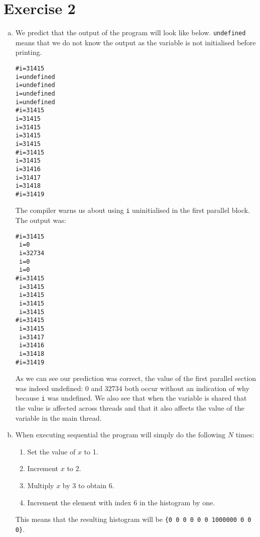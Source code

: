 \documentclass[a4paper]{article}
\begin{document}
\section{Exercise 2}
\begin{enumerate}[(a)]
	\item We predict that the output of the program will look like below. \texttt{undefined} means that we do not know the output as the variable is not initialised before printing.
		\begin{lstlisting}
#i=31415
i=undefined
i=undefined
i=undefined
i=undefined
#i=31415
i=31415
i=31415
i=31415
i=31415
#i=31415
i=31415
i=31416
i=31417
i=31418
#i=31419
		\end{lstlisting}
		The compiler warns us about using \texttt{i} uninitialised in the first parallel block. The output was:
		\begin{lstlisting}
#i=31415
 i=0
 i=32734
 i=0
 i=0
#i=31415
 i=31415
 i=31415
 i=31415
 i=31415
#i=31415
 i=31415
 i=31417
 i=31416
 i=31418
#i=31419
		\end{lstlisting}
		As we can see our prediction was correct, the value of the first parallel section was indeed undefined: 0 and 32734 both occur without an indication of why because \texttt{i} was undefined. We also see that when the variable is shared that the value is affected across threads and that it also affects the value of the variable in the main thread.
	\setcounter{enumi}{0}
	\item When executing sequential the program will simply do the following $N$ times:
		\begin{enumerate}[1.]
			\item Set the value of $x$ to 1.
			\item Increment $x$ to 2.
			\item Multiply $x$ by 3 to obtain 6.
			\item Increment the element with index 6 in the histogram by one.
		\end{enumerate}
		This means that the resulting histogram will be \texttt{\{0 0 0 0 0 0 1000000 0 0 0\}}.
		

\end{enumerate}
\end{document}
